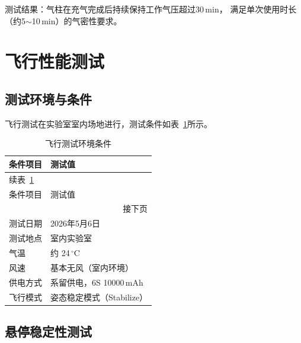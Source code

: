 测试结果：气柱在充气完成后持续保持工作气压超过30\,min，
满足单次使用时长（约5$\sim$10\,min）的气密性要求。

\section{飞行性能测试}

\subsection{测试环境与条件}

飞行测试在实验室室内场地进行，测试条件如表~\ref{tab:test_condition}所示。

\begin{longtable}{ll}
    \caption{飞行测试环境条件}
    \label{tab:test_condition} \\

    \toprule
    条件项目 & 测试值 \\
    \midrule
    \endfirsthead

    \multicolumn{2}{l}{\small 续表~\ref*{tab:test_condition}} \\[2pt]
    \toprule
    条件项目 & 测试值 \\
    \midrule
    \endhead

    \midrule
    \multicolumn{2}{r}{\small 接下页} \\
    \endfoot

    \bottomrule
    \endlastfoot

    测试日期     & 2026年5月6日 \\[3pt]
    测试地点     & 室内实验室 \\[3pt]
    气温         & 约 24\,$^\circ$C \\[3pt]
    风速         & 基本无风（室内环境） \\[3pt]
    供电方式     & 系留供电，6S 10000\,mAh \\[3pt]
    飞行模式     & 姿态稳定模式（Stabilize） \\

\end{longtable}

\subsection{悬停稳定性测试}

